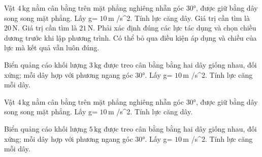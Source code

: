 \begin{ex}
Vật $4\,\text{kg}$ nằm cân bằng trên mặt phẳng nghiêng nhẵn góc 30°, được giữ bằng dây song song mặt phẳng. Lấy g= $10\,\text{m}$ /s^2. Tính lực căng dây.
\choiceTF
{\True Giá trị cần tìm là $20\,\text{N}$.}
{Giá trị cần tìm là $21\,\text{N}$.}
{\True Phải xác định đúng các lực tác dụng và chọn chiều dương trước khi lập phương trình.}
{Có thể bỏ qua điều kiện áp dụng và chiều của lực mà kết quả vẫn luôn đúng.}
\end{ex}

\begin{ex}
Biển quảng cáo khối lượng $3\,\text{kg}$ được treo cân bằng bằng hai dây giống nhau, đối xứng; mỗi dây hợp với phương ngang góc 30°. Lấy g= $10\,\text{m}$ /s^2. Tính lực căng mỗi dây.
\end{ex}

\begin{ex}
Vật $4\,\text{kg}$ nằm cân bằng trên mặt phẳng nghiêng nhẵn góc 30°, được giữ bằng dây song song mặt phẳng. Lấy g= $10\,\text{m}$ /s^2. Tính lực căng dây.
\end{ex}

\begin{ex}
Biển quảng cáo khối lượng $5\,\text{kg}$ được treo cân bằng bằng hai dây giống nhau, đối xứng; mỗi dây hợp với phương ngang góc 30°. Lấy g= $10\,\text{m}$ /s^2. Tính lực căng mỗi dây.
\end{ex}

